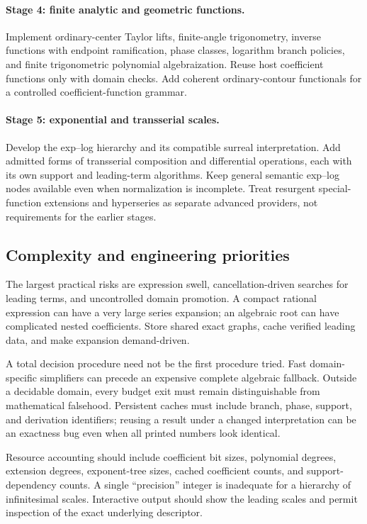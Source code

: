 \documentclass[11pt,letterpaper]{article}
\theoremstyle{definition}
\numberwithin{equation}{section}
\begin{document}
\paragraph{Stage 4: finite analytic and geometric functions.}
Implement ordinary-center Taylor lifts, finite-angle trigonometry, inverse functions with endpoint ramification, phase classes, logarithm branch policies, and finite trigonometric polynomial algebraization. Reuse host coefficient functions only with domain checks. Add coherent ordinary-contour functionals for a controlled coefficient-function grammar.

\paragraph{Stage 5: exponential and transserial scales.}
Develop the exp--log hierarchy and its compatible surreal interpretation. Add admitted forms of transserial composition and differential operations, each with its own support and leading-term algorithms. Keep general semantic exp--log nodes available even when normalization is incomplete. Treat resurgent special-function extensions and hyperseries as separate advanced providers, not requirements for the earlier stages.

\subsection{Complexity and engineering priorities}
The largest practical risks are expression swell, cancellation-driven searches for leading terms, and uncontrolled domain promotion. A compact rational expression can have a very large series expansion; an algebraic root can have complicated nested coefficients. Store shared exact graphs, cache verified leading data, and make expansion demand-driven.

A total decision procedure need not be the first procedure tried. Fast domain-specific simplifiers can precede an expensive complete algebraic fallback. Outside a decidable domain, every budget exit must remain distinguishable from mathematical falsehood. Persistent caches must include branch, phase, support, and derivation identifiers; reusing a result under a changed interpretation can be an exactness bug even when all printed numbers look identical.

Resource accounting should include coefficient bit sizes, polynomial degrees, extension degrees, exponent-tree sizes, cached coefficient counts, and support-dependency counts. A single ``precision'' integer is inadequate for a hierarchy of infinitesimal scales. Interactive output should show the leading scales and permit inspection of the exact underlying descriptor.
\end{document}
